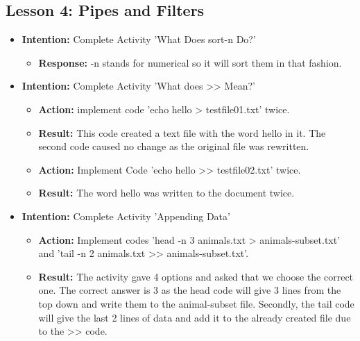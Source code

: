 \documentclass{article}
\begin{document}
\subsection{Lesson 4: Pipes and Filters}
\date{16:30 1/09/2019}
\begin{itemize}

\item{\textbf{Intention:} Complete Activity 'What Does sort-n Do?'}
\begin{itemize}

\item{\textbf{Response:} -n stands for numerical so it will sort them in that fashion.}

\end{itemize}

\item{\textbf{Intention:} Complete Activity 'What does >> Mean?'}

\begin{itemize}
\item{\textbf{Action:} implement code 'echo hello > testfile01.txt' twice.}

\item{\textbf{Result:} This code created a text file with the word hello in it. The second code caused no change as the original file was rewritten.}

\item{\textbf{Action:} Implement Code 'echo hello >> testfile02.txt' twice.}

\item{\textbf{Result:} The word hello was written to the document twice.}

\end{itemize}

\item{\textbf{Intention:} Complete Activity 'Appending Data'}

\begin{itemize}
\item{\textbf{Action:} Implement codes 'head -n 3 animals.txt > animals-subset.txt' and 'tail -n 2 animals.txt >> animals-subset.txt'.}

\item{\textbf{Result:} The activity gave 4 options and asked that we choose the correct one. The correct answer is 3 as the head code will give 3 lines from the top down and write them to the animal-subset file. Secondly, the tail code will give the last 2 lines of data and add it to the already created file due to the >> code.}


\end{itemize}
\end{itemize}
\end{document}
